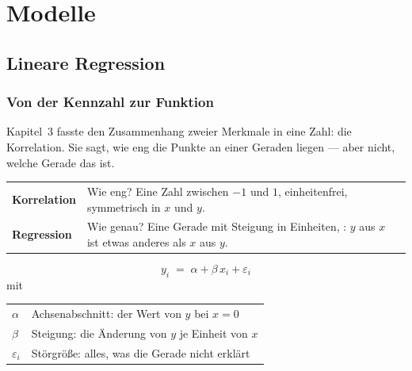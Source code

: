 \part{Modelle}

\chapter{Lineare Regression}

\section{Von der Kennzahl zur Funktion}

Kapitel~3 fasste den Zusammenhang zweier Merkmale in eine Zahl: die Korrelation. Sie sagt, wie eng die Punkte an einer Geraden liegen --- aber nicht, welche Gerade das ist.

\begin{merksatz}
\begin{center}
\renewcommand{\arraystretch}{1.5}
\begin{tabular}{@{}P{2.4cm}P{6.2cm}@{}}
\toprule
\textbf{Korrelation} & Wie eng? Eine Zahl zwischen $-1$ und $1$, einheitenfrei, symmetrisch in $x$ und $y$.\\
\textbf{Regression} & Wie genau? Eine Gerade mit Steigung in Einheiten, : $y$ aus $x$ ist etwas anderes als $x$ aus $y$.\\
\bottomrule
\end{tabular}
\end{center}

\begin{center}
\begin{minipage}{0.88\textwidth}
\end{minipage}
\end{center}
\end{merksatz}

\begin{definition}
\[ y_i \;=\; \alpha + \beta\,x_i + \varepsilon_i \]
mit
\begin{center}
\renewcommand{\arraystretch}{1.5}
\begin{tabular}{@{}P{1.6cm}P{6.8cm}@{}}
\toprule
$\alpha$ & Achsenabschnitt: der Wert von $y$ bei $x = 0$\\
$\beta$ & Steigung: die Änderung von $y$ je Einheit von $x$\\
$\varepsilon_i$ & Störgröße: alles, was die Gerade nicht erklärt\\
\bottomrule
\end{tabular}
\end{center}
\end{definition}

